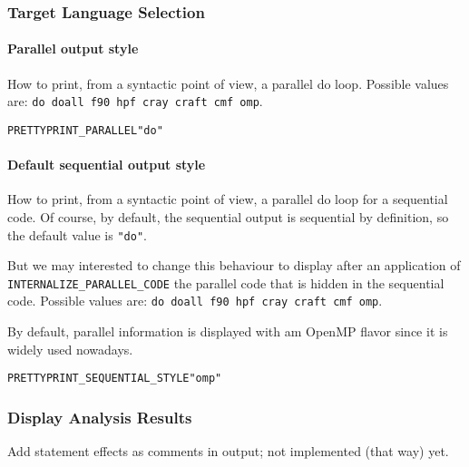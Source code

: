 \documentclass[a4paper]{report}
\newenvironment{PipsProp}{\begin{alltt}}{\end{alltt}}
\begin{document}
\subsubsection{Target Language Selection}

\paragraph{Parallel output style}
\label{sec:parall-outp-style}

How to print, from a syntactic point of view, a parallel do loop. Possible
values are: \texttt{do doall f90 hpf cray craft cmf omp}.

\begin{PipsProp}
PRETTYPRINT_PARALLEL    "do"
\end{PipsProp}


\paragraph{Default sequential output style}
\label{sec:sequ-outp-style}

How to print, from a syntactic point of view, a parallel do loop for a
sequential code. Of course, by default, the sequential output is
sequential by definition, so the default value is \verb/"do"/.

But we may interested to change this behaviour to display after an
application of \verb|INTERNALIZE_PARALLEL_CODE| the parallel code that is
hidden in the sequential code. Possible values are: \texttt{do doall f90
  hpf cray craft cmf omp}.

By default, parallel information is displayed with am OpenMP flavor since
it is widely used nowadays.
\begin{PipsProp}
PRETTYPRINT_SEQUENTIAL_STYLE    "omp"
\end{PipsProp}


\subsubsection{Display Analysis Results}

Add statement effects as comments in output; not implemented (that way) yet.
\end{document}
